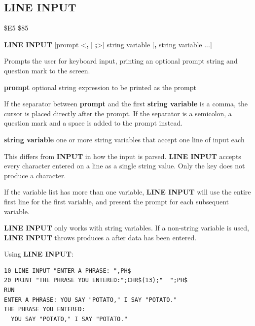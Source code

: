 \subsection{LINE INPUT}
\begin{description}[leftmargin=2cm,style=nextline]
\item [Token:] \$E5 \$85
\item [Format:] {\bf LINE INPUT} [prompt <{\bf,} | {\bf;}>]
		string variable [{\bf,} string variable ...]
\item [Usage:] Prompts the user for keyboard input, printing an optional
               prompt string and question mark to the screen.

               {\bf prompt} optional string expression to be printed
               as the prompt

               If the separator between {\bf prompt} and the first {\bf string
               variable} is a comma, the cursor is placed directly after the
               prompt. If the separator is a semicolon, a question mark and a
               space is added to the prompt instead.

               {\bf string variable} one or more string variables that accept
               one line of input each

\item [Remarks:] This differs from {\bf INPUT} in how the input is parsed.
                {\bf LINE INPUT} accepts every character entered on a line as
                a single string value. Only the  key does
                not produce a character.

                If the variable list has more than one variable, {\bf LINE
                INPUT} will use the entire first line for the first variable,
                and present the  prompt for each subsequent
                variable.

                {\bf LINE INPUT} only works with string variables. If a
                non-string variable is used, {\bf LINE INPUT} throws produces
                a  after data has been
                entered.

\item [Example:] Using {\bf LINE INPUT}:
\begin{tcolorbox}[colback=black,coltext=white]
\verbatimfont{\codefont}
\begin{verbatim}
10 LINE INPUT "ENTER A PHRASE: ",PH$
20 PRINT "THE PHRASE YOU ENTERED:";CHR$(13);"  ";PH$
RUN
ENTER A PHRASE: YOU SAY "POTATO," I SAY "POTATO."
THE PHRASE YOU ENTERED:
  YOU SAY "POTATO," I SAY "POTATO."
\end{verbatim}
\end{tcolorbox}
\end{description}

